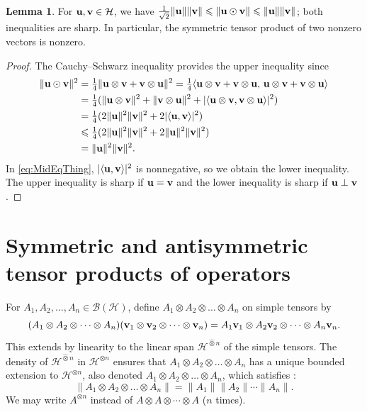 \documentclass[10pt,reqno]{amsart}
\newcommand{\0}{{\color{lightgray}0}}
\newcommand{\B}{\mathcal{B}}
\renewcommand{\leq}{\leqslant}
\newcommand{\norm}[1]{\| #1 \|}
\newcommand{\h}{\mathcal{H}}
\renewcommand{\hat}{\widehat}
\renewcommand{\vec}[1]{{\bf #1}}
\theoremstyle{definition}
\newtheorem{Lemma}[equation]{Lemma}
\numberwithin{equation}{section}
\begin{document}
\begin{Lemma}\label{Lemma:VectorBounds}
For $\vec{u}, \vec{v} \in \h$, we have
$\frac{1}{\sqrt{2}}\| \vec{u} \| \| \vec{v} \| \leq \| \vec{u} \odot \vec{v} \| \leq \| \vec{u} \| \| \vec{v} \|$;
both inequalities are sharp.  In particular, the symmetric tensor product of two nonzero vectors is nonzero.
\end{Lemma}

\begin{proof}
The Cauchy--Schwarz inequality provides the upper inequality since
\begin{align}
    \| \vec{u} \odot \vec{v} \|^2  
    &= \tfrac{1}{4} \| \vec{u} \otimes \vec{v} + \vec{v} \otimes \vec{u} \|^2 
    = \tfrac{1}{4} \langle \vec{u} \otimes \vec{v} + \vec{v} \otimes \vec{u}, \, \vec{u} \otimes \vec{v} + \vec{v} \otimes \vec{u} \rangle \\
    &= \tfrac{1}{4} ( \norm{ \vec{u} \otimes \vec{v} }^2 + \norm{\vec{v} \otimes \vec{u}}^2+ |\langle \vec{u} \otimes \vec{v}, \vec{v} \otimes \vec{u}\rangle |^2) \\
    &= \tfrac{1}{4} (2\| \vec{u} \|^2 \| \vec{v} \|^2 + 2 |\langle \vec{u}, \vec{v} \rangle|^2 ) \label{eq:MidEqThing} \\
    & \leq  \tfrac{1}{4} (2\| \vec{u} \|^2 \| \vec{v} \|^2 + 2\| \vec{u} \|^2 \| \vec{v} \|^2) \\
    &= \|\vec{u} \|^2 \|\vec{v} \|^2.
\end{align}
In \eqref{eq:MidEqThing}, $|\langle \vec{u}, \vec{v} \rangle|^2$ is nonnegative, so we obtain the lower inequality.
The upper inequality is sharp if $\vec{u} = \vec{v}$ and the lower inequality is sharp if $\vec{u} \perp \vec{v}$.
\end{proof}


\section{Symmetric and antisymmetric tensor products of operators}\label{Section:TensorOperators}
For $A_1, A_2, \ldots, A_n \in \B(\h)$, define $A_1 \otimes A_2 \otimes \dots \otimes  A_n$ on simple tensors by
\begin{equation*}
    (A_1 \otimes A_2 \otimes \dots \otimes  A_n) (\vec{v}_1 \otimes \vec{v}_2 \otimes \cdots \otimes \vec{v}_n) 
    = A_1 \vec{v}_1 \otimes A_2 \vec{v}_2  \otimes  \cdots \otimes  A_n \vec{v}_n.
\end{equation*}
This extends by linearity to the linear span $\h^{ \hat{\otimes}n}$ of the simple tensors.
The density of $\h^{\hat{\otimes}n}$ in $\h^{\otimes n}$ ensures that
$A_1 \otimes A_2 \otimes \dots \otimes  A_n$ has a unique bounded extension to $\h^{\otimes n}$,
also denoted $A_1 \otimes A_2 \otimes \dots \otimes  A_n$, which satisfies \cite[(3.8.17)]{SimonReal}:
\begin{equation}\label{eq:BoundedExtend}
    \| A_1 \otimes A_2 \otimes \dots \otimes  A_n \| =  \| A_1 \| \| A_2 \| \cdots \|A_n \|.
\end{equation}
We may write $A^{\otimes n}$ instead of $A \otimes A \otimes \cdots \otimes A$ 
($n$ times).
\end{document}
